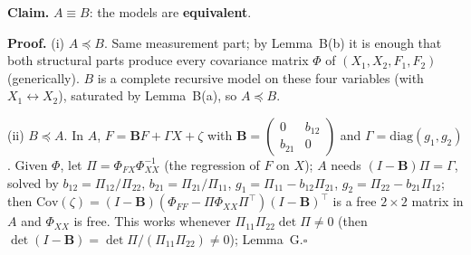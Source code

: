 \documentclass[10pt,a4paper]{article}
\newcommand{\nest}{\preceq}
\begin{document}
\par\bigskip
\noindent\textbf{Claim.} $A \equiv B$: the models are \textbf{equivalent}.\par\smallskip
\noindent\textbf{Proof.} (i) $A\nest B$. Same measurement part; by Lemma~B(b) it is enough that both structural parts produce every covariance matrix $\Phi$ of $(X_1,X_2,F_1,F_2)$ (generically). $B$ is a complete recursive model on these four variables (with $X_1\leftrightarrow X_2$), saturated by Lemma~B(a), so $A\nest B$.\par\smallskip
\noindent(ii) $B\nest A$. In $A$, $F=\mathbf BF+\Gamma X+\zeta$ with $\mathbf B=\begin{pmatrix}0&b_{12}\\b_{21}&0\end{pmatrix}$ and $\Gamma=\mathrm{diag}(g_1,g_2)$. Given $\Phi$, let $\Pi=\Phi_{FX}\Phi_{XX}^{-1}$ (the regression of $F$ on $X$); $A$ needs $(I-\mathbf B)\Pi=\Gamma$, solved by $b_{12}=\Pi_{12}/\Pi_{22}$, $b_{21}=\Pi_{21}/\Pi_{11}$, $g_1=\Pi_{11}-b_{12}\Pi_{21}$, $g_2=\Pi_{22}-b_{21}\Pi_{12}$; then $\mathrm{Cov}(\zeta)=(I-\mathbf B)(\Phi_{FF}-\Pi\Phi_{XX}\Pi^\top)(I-\mathbf B)^\top$ is a free $2\times2$ matrix in $A$ and $\Phi_{XX}$ is free. This works whenever $\Pi_{11}\Pi_{22}\det\Pi\neq0$ (then $\det(I-\mathbf B)=\det\Pi/(\Pi_{11}\Pi_{22})\neq0$); Lemma~G.\hfill$\square$\par\medskip
{}

\clearpage
\end{document}
